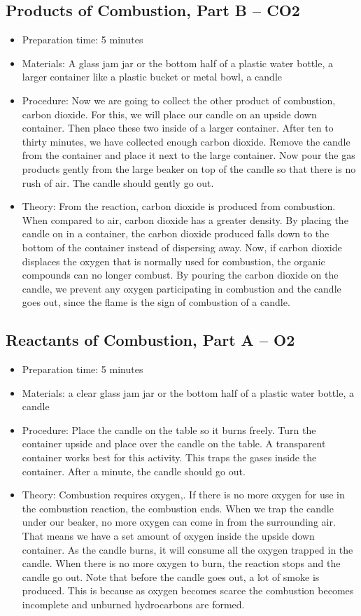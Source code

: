 \subsection{Products of Combustion, Part B – CO2}
\begin{itemize}
\item{Preparation time: 5 minutes}
\item{Materials: A glass jam jar or the bottom half of a plastic water bottle, a larger container like a plastic bucket or metal bowl, a candle}
\item{Procedure: Now we are going to collect the other product of combustion, carbon dioxide. For this, we will place our candle on an upside down container. Then place these two inside of a larger container. After ten to thirty minutes, we have collected enough carbon dioxide. Remove the candle from the container and place it next to the large container. Now pour the gas products gently from the large beaker on top of the candle so that there is no rush of air. The candle should gently go out.}
\item{Theory: From the reaction, carbon dioxide is produced from combustion. When compared to air, carbon dioxide has a greater density. By placing the candle on in a container, the carbon dioxide produced falls down to the bottom of the container instead of dispersing away. Now, if carbon dioxide displaces the oxygen that is normally used for combustion, the organic compounds can no longer combust. By pouring the carbon dioxide on the candle, we prevent any oxygen participating in combustion and the candle goes out, since the flame is the sign of combustion of a candle.}
\end{itemize}

\subsection{Reactants of Combustion, Part A – O2}
\begin{itemize}
\item{Preparation time: 5 minutes}
\item{Materials: a clear glass jam jar or the bottom half of a plastic water bottle, a candle}
\item{Procedure: Place the candle on the table so it burns freely. Turn the container upside and place over the candle on the table. A transparent container works best for this activity. This traps the gases inside the container. After a minute, the candle should go out.}
\item{Theory:  Combustion requires oxygen,. If there is no more oxygen for use in the combustion reaction, the combustion ends. When we trap the candle under our beaker, no more oxygen can come in from the surrounding air. That means we have a set amount of oxygen inside the upside down container. As the candle burns, it will consume all the oxygen trapped in the candle. When there is no more oxygen to burn, the reaction stops and the candle go out. Note that before the candle goes out, a lot of smoke is produced. This is because as oxygen becomes scarce the combustion becomes incomplete and unburned hydrocarbons are formed.}
\end{itemize}

